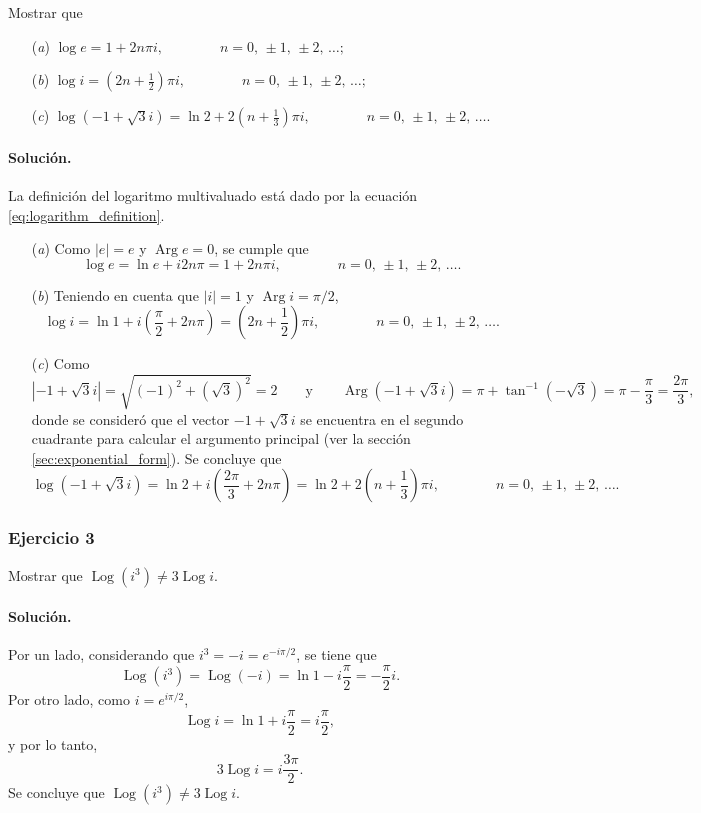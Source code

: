 \documentclass[a4paper]{report}
\DeclareMathOperator{\Arg}{Arg}
\DeclareMathOperator{\Log}{Log}
\begin{document}
Mostrar que  
\begin{enumerate}
 \item[(\textit{a})] \(\displaystyle\log e=1+2n\pi i,\qquad\qquad n=0,\,\pm1,\,\pm2,\,\dots;\)
 \item[(\textit{b})] \(\displaystyle\log i=\left(2n+\frac{1}{2}\right)\pi i,\qquad\qquad n=0,\,\pm1,\,\pm2,\,\dots;\)
 \item[(\textit{c})] \(\displaystyle\log(-1+\sqrt{3}i)=\ln2+2\left(n+\frac{1}{3}\right)\pi i,\qquad\qquad n=0,\,\pm1,\,\pm2,\,\dots\).
\end{enumerate}

\paragraph{Solución.} La definición del logaritmo multivaluado está dado por la ecuación \ref{eq:logarithm_definition}.

\begin{enumerate}
 \item[(\textit{a})] Como \(|e|=e\) y \(\Arg e=0\), se cumple que 
 \[
  \displaystyle\log e=\ln e+i2n\pi=1+2n\pi i,\qquad\qquad n=0,\,\pm1,\,\pm2,\,\dots.
 \]
 \item[(\textit{b})] Teniendo en cuenta que \(|i|=1\) y \(\Arg i=\pi/2\),
 \[
  \log i=\ln1+i\left(\frac{\pi}{2}+2n\pi\right)=\left(2n+\frac{1}{2}\right)\pi i,\qquad\qquad n=0,\,\pm1,\,\pm2,\,\dots.
 \]
 \item[(\textit{c})] Como
 \[
  |-1+\sqrt{3}i|=\sqrt{(-1)^2+(\sqrt{3})^2}=2
  \qquad\textrm{y}\qquad 
  \Arg(-1+\sqrt{3}i)=\pi+\tan^{-1}(-\sqrt{3})=\pi-\frac{\pi}{3}=\frac{2\pi}{3},
 \]
 donde se consideró que el vector \(-1+\sqrt{3}i\) se encuentra en el segundo cuadrante para calcular el argumento principal (ver la sección \ref{sec:exponential_form}). Se concluye que
 \[
  \log(-1+\sqrt{3}i)=\ln2+i\left(\frac{2\pi}{3}+2n\pi\right)=\ln2+2\left(n+\frac{1}{3}\right)\pi i,\qquad\qquad n=0,\,\pm1,\,\pm2,\,\dots.
 \]
\end{enumerate}

\subsubsection{Ejercicio 3}

Mostrar que \(\Log(i^3)\neq3\Log i\).

\paragraph{Solución.} Por un lado, considerando que \(i^3=-i=e^{-i\pi/2}\), se tiene que 
\[
 \Log(i^3)=\Log(-i)=\ln1-i\frac{\pi}{2}=-\frac{\pi}{2}i.
\]
Por otro lado, como \(i=e^{i\pi/2}\),
\[
 \Log i=\ln1+i\frac{\pi}{2}=i\frac{\pi}{2},
\]
y por lo tanto,
\[
 3\Log i=i\frac{3\pi}{2}.
\]
Se concluye que \(\Log(i^3)\neq3\Log i\).
\end{document}
